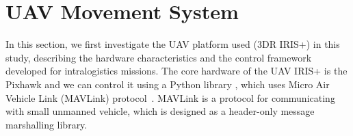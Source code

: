 \documentclass[conference,harvard,brazil,english]{sbatex}
\newcommand{\R}{\mathbb R}
\begin{document}
%

\section{UAV Movement System}
\label{sec:uav}


In this section, we first investigate the UAV platform used (3DR IRIS+) in this study, describing the hardware characteristics and the control framework developed for intralogistics missions. The core hardware of the UAV IRIS+ is the Pixhawk and we can control it using a Python library \cite{dronekit}, which uses Micro Air Vehicle Link (MAVLink) protocol~\cite{meier2011pixhawk}. MAVLink is a protocol for communicating with small unmanned vehicle, which is designed as a header-only message marshalling library.
\end{document}
